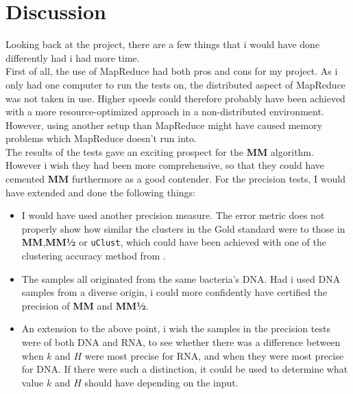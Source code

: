 \documentclass[../../main.tex]{subfiles}
\begin{document}
\section{Discussion}

Looking back at the project, there are a few things that i would have done differently had i had more time.\\

First of all, the use of MapReduce had both pros and cons for my project. As i only had one computer to run the tests on, the distributed aspect of MapReduce was not taken in use. Higher speeds could therefore probably have been achieved with a more resource-optimized approach in a non-distributed environment. However, using another setup than MapReduce might have caused memory problems which MapReduce doesn't run into.\\

The results of the tests gave an exciting prospect for the {\bf MM} algorithm. However i wish they had been more comprehensive, so that they could have cemented {\bf MM} furthermore as a good contender. For the precision tests, I would have extended and done the following things:
\begin{itemize}
\item I would have used another precision measure. The error metric does not properly show how similar the clusters in the Gold standard were to those in {\bf MM},{\bf MM½} or {\tt uClust}, which could have been achieved with one of the clustering accuracy method from \cite{measuringcluster}.
\item The samples all originated from the same bacteria's DNA. Had i used DNA samples from a diverse origin, i could more confidently have certified the precision of {\bf MM} and {\bf MM½}.
\item An extension to the above point, i wish the samples in the precision tests were of both DNA and RNA, to see whether there was a difference between when $k$ and $H$ were most precise for RNA, and when they were most precise for DNA. If there were such a distinction, it could be used to determine what value $k$ and $H$ should have depending on the input.    
\end{itemize}
\end{document}

